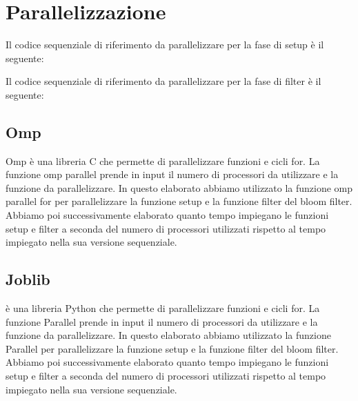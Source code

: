 \documentclass[11pt]{article}
\begin{document}
    \section{Parallelizzazione}\label{sec:parallelizazzione}
    Il codice sequenziale di riferimento da parallelizzare per la fase di setup è il seguente:
    

    Il codice sequenziale di riferimento da parallelizzare per la fase di filter è il seguente:
    

    \subsection{Omp}\label{subsec:omp}
    Omp è una libreria C che permette di parallelizzare funzioni e cicli for.
    La funzione omp parallel prende in input il numero di processori da utilizzare e la funzione da parallelizzare.
    In questo elaborato abbiamo utilizzato la funzione omp parallel for per parallelizzare la funzione setup e la
    funzione filter del bloom filter.
    Abbiamo poi successivamente elaborato quanto tempo impiegano le funzioni setup e filter a seconda del numero di
    processori utilizzati rispetto al tempo impiegato nella sua versione sequenziale.

    \subsection{Joblib}\label{subsec:joblib}
    è una libreria Python che permette di parallelizzare funzioni e cicli for.
    La funzione Parallel prende in input il numero di processori da utilizzare e la funzione da parallelizzare.
    In questo elaborato abbiamo utilizzato la funzione Parallel per parallelizzare la funzione setup e la funzione
    filter del bloom filter.
    Abbiamo poi successivamente elaborato quanto tempo impiegano le funzioni setup e filter a seconda del numero di
    processori utilizzati rispetto al tempo impiegato nella sua versione sequenziale.
    
    
\end{document}
